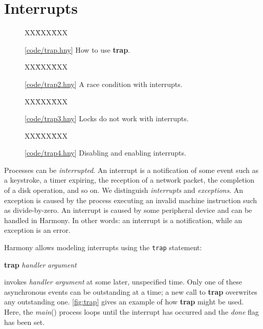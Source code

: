 \documentclass{report}
\newcommand{\harmonysource}[1]{
\begin{tabbing}
XX\=XXX\=XXX\kill
    
\end{tabbing}
}
\newcommand{\harmonylink}[1]{%
[\href{https://www.cs.cornell.edu/home/rvr/harmony/#1}{\underline{#1}}]%
}
\newenvironment{code}{
\tcolorbox
}{
\endtcolorbox
}
\begin{document}
\chapter{Interrupts}
\label{ch:interrupts}

\begin{figure}
\begin{code}
\harmonysource{trap}
\end{code}
\caption{\harmonylink{code/trap.hny} How to use \textbf{trap}.}
\label{fig:trap}
\end{figure}

\begin{figure}
\begin{code}
\harmonysource{trap2}
\end{code}
\caption{\harmonylink{code/trap2.hny} A race condition with interrupts.}
\label{fig:trap2}
\end{figure}

\begin{figure}
\begin{code}
\harmonysource{trap3}
\end{code}
\caption{\harmonylink{code/trap3.hny} Locks do not work with interrupts.}
\label{fig:trap3}
\end{figure}

\begin{figure}
\begin{code}
\harmonysource{trap4}
\end{code}
\caption{\harmonylink{code/trap4.hny} Disabling and enabling interrupts.}
\label{fig:trap4}
\end{figure}

Processes can be \emph{interrupted}.  An interrupt is a notification of some event
such as a keystroke, a timer expiring, the reception of a network packet, the completion
of a disk operation, and so on.  We distinguish \emph{interrupts} and \emph{exceptions}.
An exception is caused by the process executing an invalid machine instruction such as
divide-by-zero.  An interrupt is caused by some peripheral device and can be handled in
Harmony.
In other words: an interrupt is a notification, while an exception is an error.

Harmony allows modeling interrupts using the \texttt{trap} statement:
\begin{code}
\textbf{trap} \textit{handler} \textit{argument}
\end{code}
invokes \textit{handler argument} at some later, unspecified time.
Only one of these asynchronous events can be outstanding at a time; a new call to
\textbf{trap} overwrites any outstanding one.
\autoref{fig:trap} gives an example of how \textbf{trap} might be used.
Here, the \textit{main}() process loops until the interrupt has occurred and
the \textit{done} flag has been set.
\end{document}

